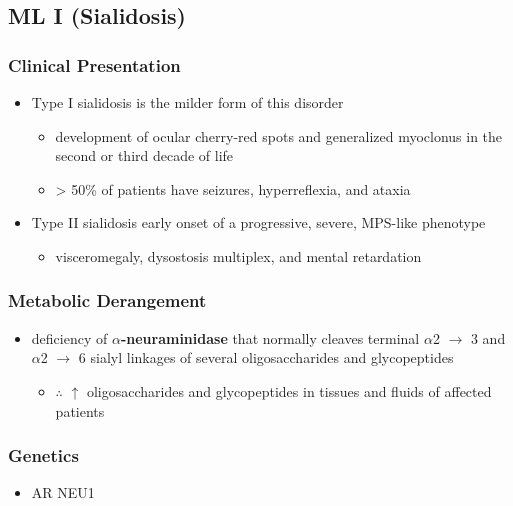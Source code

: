 \documentclass[12pt]{scrartcl}
\begin{document}
\subsection{ML I (Sialidosis)}
\label{sec:org6da3301}
\subsubsection{Clinical Presentation}
\label{sec:orgfdf02e6}
\begin{itemize}
\item Type I sialidosis is the milder form of this disorder
\begin{itemize}
\item development of ocular cherry-red spots and generalized
myoclonus in the second or third decade of life
\item \textgreater{} 50\% of patients have seizures, hyperreflexia, and ataxia
\end{itemize}

\item Type II sialidosis early onset of a progressive, severe, MPS-like
phenotype
\begin{itemize}
\item visceromegaly, dysostosis multiplex, and mental retardation
\end{itemize}
\end{itemize}

\subsubsection{Metabolic Derangement}
\label{sec:orgee82e9a}
\begin{itemize}
\item deficiency of \textbf{\(\alpha\)-neuraminidase} that normally cleaves terminal
\(\alpha\)2 \(\to\) 3 and \(\alpha\)2 \(\to\) 6 sialyl linkages of several
oligosaccharides and glycopeptides
\begin{itemize}
\item \(\therefore\) \(\uparrow\) oligosaccharides and glycopeptides in tissues
and fluids of affected patients
\end{itemize}
\end{itemize}

\subsubsection{Genetics}
\label{sec:org80b5408}
\begin{itemize}
\item AR NEU1
\end{itemize}
\end{document}
